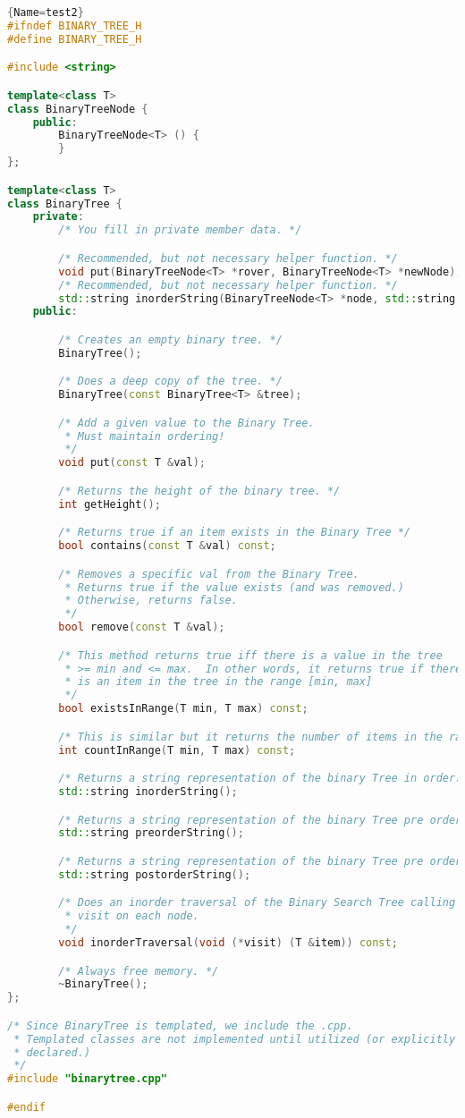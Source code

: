 \documentclass[12pt]{article}
\begin{document}
\begin{lstlisting}[language=C++]{Name=test2}
#ifndef BINARY_TREE_H
#define BINARY_TREE_H

#include <string>

template<class T>
class BinaryTreeNode {
    public:
        BinaryTreeNode<T> () {
        }
};

template<class T>
class BinaryTree {
    private:
        /* You fill in private member data. */

        /* Recommended, but not necessary helper function. */
        void put(BinaryTreeNode<T> *rover, BinaryTreeNode<T> *newNode);
        /* Recommended, but not necessary helper function. */
        std::string inorderString(BinaryTreeNode<T> *node, std::string &ret);
    public:

        /* Creates an empty binary tree. */
        BinaryTree();

        /* Does a deep copy of the tree. */
        BinaryTree(const BinaryTree<T> &tree);

        /* Add a given value to the Binary Tree. 
         * Must maintain ordering!
         */
        void put(const T &val);

        /* Returns the height of the binary tree. */
        int getHeight();

        /* Returns true if an item exists in the Binary Tree */
        bool contains(const T &val) const;

        /* Removes a specific val from the Binary Tree.
         * Returns true if the value exists (and was removed.)
         * Otherwise, returns false.
         */
        bool remove(const T &val);

        /* This method returns true iff there is a value in the tree 
         * >= min and <= max.  In other words, it returns true if there
         * is an item in the tree in the range [min, max]
         */
        bool existsInRange(T min, T max) const;

        /* This is similar but it returns the number of items in the range. */
        int countInRange(T min, T max) const;

        /* Returns a string representation of the binary Tree in order. */
        std::string inorderString();

        /* Returns a string representation of the binary Tree pre order. */
        std::string preorderString();

        /* Returns a string representation of the binary Tree pre order. */
        std::string postorderString();

        /* Does an inorder traversal of the Binary Search Tree calling
         * visit on each node.
         */
        void inorderTraversal(void (*visit) (T &item)) const;

        /* Always free memory. */
        ~BinaryTree();
};

/* Since BinaryTree is templated, we include the .cpp.
 * Templated classes are not implemented until utilized (or explicitly 
 * declared.)
 */
#include "binarytree.cpp"

#endif
\end{lstlisting}
\end{document}
